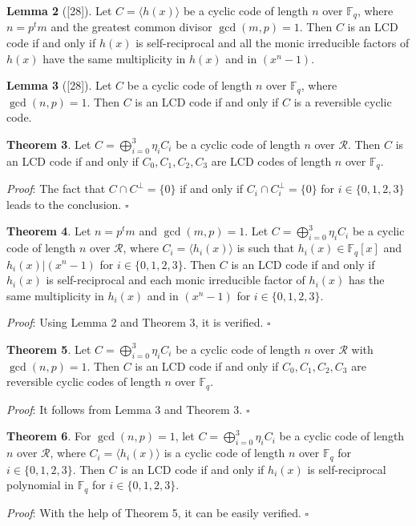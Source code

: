 \documentclass[12pt]{article}
\begin{document}
\textbf{Lemma 2} ([28]). Let $C = \langle h(x) \rangle$ be a cyclic code of length $n$ over $\mathbb{F}_q$, where $n = p^t m$ and the greatest common divisor $\gcd(m, p) = 1$. Then $C$ is an LCD code if and only if $h(x)$ is self-reciprocal and all the monic irreducible factors of $h(x)$ have the same multiplicity in $h(x)$ and in $(x^n - 1)$.

\textbf{Lemma 3} ([28]). Let $C$ be a cyclic code of length $n$ over $\mathbb{F}_q$, where $\gcd(n, p) = 1$. Then $C$ is an LCD code if and only if $C$ is a reversible cyclic code.

\textbf{Theorem 3}. Let $C = \bigoplus\limits_{i=0}^3 \eta_i C_i$ be a cyclic code of length $n$ over $\mathcal{R}$. Then $C$ is an LCD code if and only if $C_0, C_1, C_2, C_3$ are LCD codes of length $n$ over $\mathbb{F}_q$.

\textit{Proof}: The fact that $C \cap C^{\perp} = \{0\}$ if and only if $C_i \cap C_i^{\perp} = \{0\}$ for $i \in \{0, 1, 2, 3\}$ leads to the conclusion. $\square$

\textbf{Theorem 4}. Let $n = p^t m$ and $\gcd(m, p) = 1$. Let $C = \bigoplus\limits_{i=0}^3 \eta_i C_i$ be a cyclic code of length $n$ over $\mathcal{R}$, where $C_i = \langle h_i(x) \rangle$ is such that $h_i(x) \in \mathbb{F}_q[x]$ and $h_i(x) | (x^n - 1)$ for $i \in \{0, 1, 2, 3\}$. Then $C$ is an LCD code if and only if $h_i(x)$ is self-reciprocal and each monic irreducible factor of $h_i(x)$ has the same multiplicity in $h_i(x)$ and in $(x^n - 1)$ for $i \in \{0, 1, 2, 3\}$.

\textit{Proof}: Using Lemma 2 and Theorem 3, it is verified. $\square$

\textbf{Theorem 5}. Let $C = \bigoplus\limits_{i=0}^3 \eta_i C_i$ be a cyclic code of length $n$ over $\mathcal{R}$ with $\gcd(n, p) = 1$. Then $C$ is an LCD code if and only if $C_0, C_1, C_2, C_3$ are reversible cyclic codes of length $n$ over $\mathbb{F}_q$.

\textit{Proof}: It follows from Lemma 3 and Theorem 3. $\square$

\textbf{Theorem 6}. For $\gcd(n, p) = 1$, let $C = \bigoplus\limits_{i=0}^3 \eta_i C_i$ be a cyclic code of length $n$ over $\mathcal{R}$, where $C_i = \langle h_i(x) \rangle$ is a cyclic code of length $n$ over $\mathbb{F}_q$ for $i \in \{0, 1, 2, 3\}$. Then $C$ is an LCD code if and only if $h_i(x)$ is self-reciprocal polynomial in $\mathbb{F}_q$ for $i \in \{0, 1, 2, 3\}$.

\textit{Proof}: With the help of Theorem 5, it can be easily verified. $\square$
\end{document}
